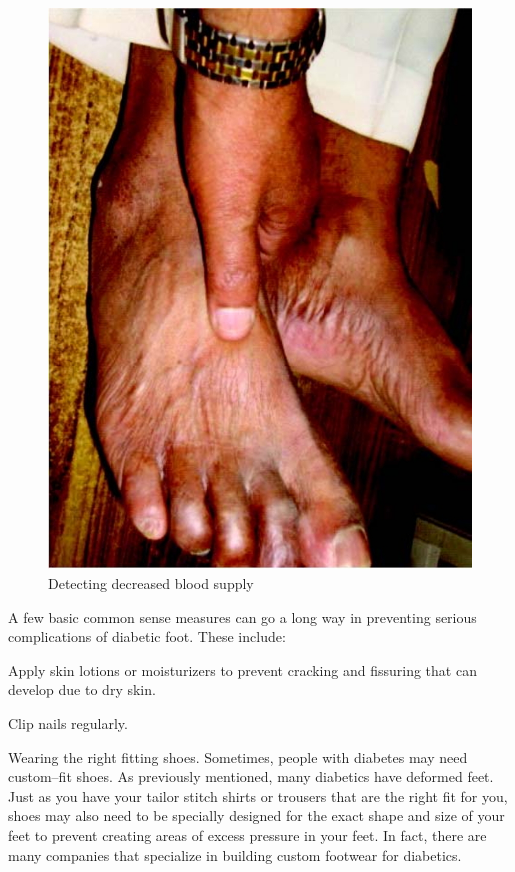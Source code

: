 \begin{figure}
\includegraphics{images/064.jpg}
\caption{Detecting decreased blood supply}
\end{figure}

A few basic common sense measures can go a long way in preventing serious complications of diabetic foot. These include:

\item Apply skin lotions or moisturizers to prevent cracking and fissuring that can develop due to dry skin.

 \item Clip nails regularly.

 \item 
 Wearing the right fitting shoes. Sometimes, people with diabetes may need custom–fit shoes. As previously mentioned, many diabetics have deformed feet. Just as you have your tailor stitch shirts or trousers that are the right fit for you, shoes may also need to be specially designed for the exact shape and size of your feet to prevent creating areas of excess pressure in your feet. In fact, there are many companies that specialize in building custom footwear for diabetics.

